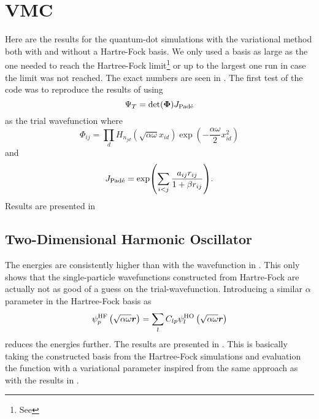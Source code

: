 \section{VMC}
    Here are the results for the quantum-dot simulations with the variational
    method both with and without a Hartre-Fock basis. We only used a basis as
    large as the one needed to reach the Hartree-Fock limit\footnote{See
    } or up to the largest one run in case the limit was not
    reached. The exact numbers are seen in . The
    first test of the code was to reproduce the results of \cite{jorgenThesis,
    hfrefarticle} using
        \begin{equation}
            \Psi_T = \text{det}(\boldsymbol{{\Phi}})J_{\text{Pad\'e}}
            \label{eq:benchtrialwave}
        \end{equation}
    as the trial wavefunction where
        \begin{equation}
            \Phi_{ij} = \prod_d
            H_{n_{jd}}\left(\sqrt{\alpha\omega}x_{id}\right)\exp(-\frac{\alpha\omega}{2}x^2_{id})
        \end{equation}
    and
        \begin{equation}
            J_{\text{Pad\'e}} = \exp(\sum\limits_{i<j} \frac{a_{ij}r_{ij}}{1+\beta
            r_{ij}}).
        \end{equation}
    Results are presented in 

\subsection{Two-Dimensional Harmonic Oscillator}
    

    

    The energies are consistently higher than with the wavefunction in
    . This only shows that the single-particle
    wavefunctions constructed from Hartre-Fock are actually not as good of a
    guess on the trial-wavefunction. Introducing a similar $\alpha$ parameter
    in the Hartree-Fock basis as
        \begin{equation}
            \psi^{\text{HF}}_p\left(\sqrt{\alpha\omega}\boldsymbol{{r}}\right) = \sum_l
            C_{lp} \psi^{\text{HO}}_l \left(\sqrt{\alpha\omega}\boldsymbol{{r}}\right)
            \label{eq:HFVARWAVE}
        \end{equation}
    reduces the energies further. The results are presented in
    . This is basically taking the constructed basis from
    the Hartree-Fock simulations and evaluation the function with a variational
    parameter inspired from the same approach as with the results in
    .
    
